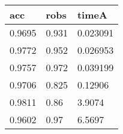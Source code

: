 \begin{tabular}{lll}
acc & robs & timeA \\ 
\hline 
0.9695 & 0.931 & 0.023091 \\ 
0.9772 & 0.952 & 0.026953 \\ 
0.9757 & 0.972 & 0.039199 \\ 
0.9706 & 0.825 & 0.12906 \\ 
0.9811 & 0.86 & 3.9074 \\ 
0.9602 & 0.97 & 6.5697 \\ 
\hline 
\end{tabular}